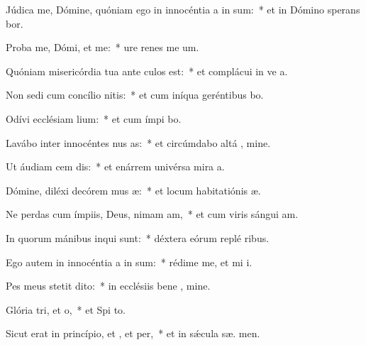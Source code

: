 \item Júdica me, Dómine, quóniam ego in innocéntia a in sum:~* et in Dómino sperans  bor.
\item Proba me, Dómi, et  me:~* ure renes me   um.
\item Quóniam misericórdia tua ante culos  est:~* et complácui in ve a.
\item Non sedi cum concílio nitis:~* et cum iníqua geréntibus  bo.
\item Odívi ecclésiam lium:~* et cum ímpi  bo.
\item Lavábo inter innocéntes nus as:~* et circúmdabo altá , mine.
\item Ut áudiam cem dis:~* et enárrem univérsa mira a.
\item Dómine, diléxi decórem mus æ:~* et locum habitatiónis  æ.
\item Ne perdas cum ímpiis, Deus, nimam am,~* et cum viris sángui  am.
\item In quorum mánibus inqui sunt:~* déxtera eórum replé  ribus.
\item Ego autem in innocéntia a in sum:~* rédime me, et mi i.
\item Pes meus stetit  dito:~* in ecclésiis bene , mine.
\item Glória tri, et o,~* et Spi to.
\item Sicut erat in princípio, et , et per,~* et in sǽcula sæ. men.

